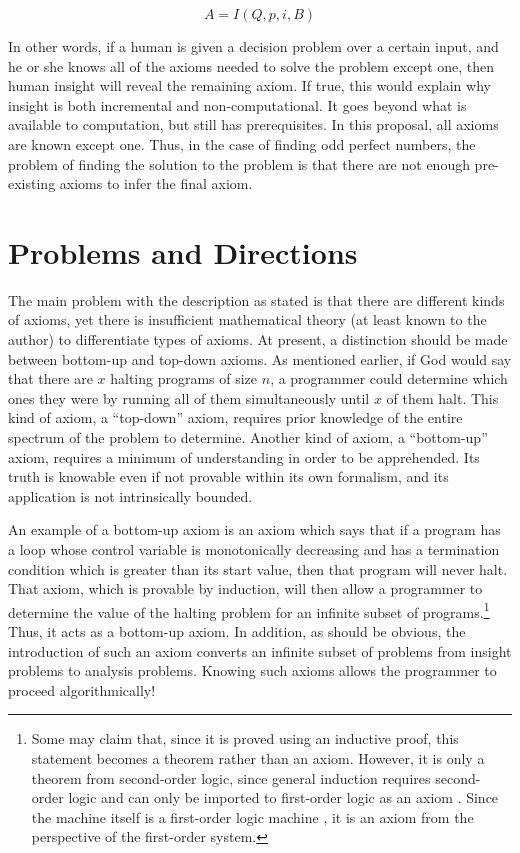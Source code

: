 \begin{equation}
A = I(Q, p, i, B)
\end{equation}

In other words, if a human is given a decision problem over a certain input, and he or she knows all of the axioms needed to solve the problem except one, then human insight will reveal the remaining axiom.  If true, this would explain why insight is both incremental and non-computational.  It goes beyond what is available to computation, but still has prerequisites. In this proposal, all axioms are known except one.  Thus, in the case of finding odd perfect numbers, the problem of finding the solution to the problem is that there are not enough pre-existing axioms to infer the final axiom.

\section{Problems and Directions}

The main problem with the description as stated is that there are different kinds of axioms, yet there is insufficient mathematical theory (at least known to the author) to differentiate types of axioms.  At present, a distinction should be made between bottom-up and top-down axioms.  As mentioned earlier, if God would say that there are $x$ halting programs of size $n$, a programmer could determine which ones they were by running all of them simultaneously until $x$ of them halt.  This kind of axiom, a ``top-down'' axiom, requires prior knowledge of the entire spectrum of the problem to determine.  Another kind of axiom, a ``bottom-up'' axiom, requires a minimum of understanding in order to be apprehended. Its truth is knowable even if not provable within its own formalism, and its application is not intrinsically bounded.  

An example of a bottom-up axiom is an axiom which says that if a program has a loop whose control variable is monotonically decreasing and has a termination condition which is greater than its start value, then that program will never halt.  That axiom, which is provable by induction, will then allow a programmer to determine the value of the halting problem for an infinite subset of programs.\footnote{Some may claim that, since it is proved using an inductive proof, this statement becomes a theorem rather than an axiom.  However, it is only a theorem from second-order logic, since general induction requires second-order logic and can only be imported to first-order logic as an axiom \citep{enderton2012}.  Since the machine itself is a first-order logic machine \citep{turing1936}, it is an axiom from the perspective of the first-order system.}  Thus, it acts as a bottom-up axiom.  In addition, as should be obvious, the introduction of such an axiom converts an infinite subset of problems from insight problems to analysis problems.  Knowing such axioms allows the programmer to proceed algorithmically!

